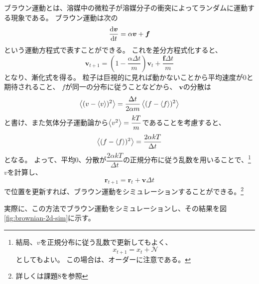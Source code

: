 ブラウン運動とは、溶媒中の微粒子が溶媒分子の衝突によってランダムに運動する現象である。
ブラウン運動は次の
\begin{equation}\label{eq:brownian-motion}
	\odv{\bm{v}}{t} = \alpha \bm{v} + \bm{f}
\end{equation}
という運動方程式で表すことができる。
これを差分方程式化すると、
\begin{equation}
	\bm{v}_{t+1} = \left(1 - \dfrac{\alpha \Delta t}{m}\right) \bm{v}_t + \dfrac{\bm{f} \Delta t}{m}
\end{equation}
となり、漸化式を得る。
粒子は巨視的に見れば動かないことから平均速度が0と期待されること、
$f$が同一の分布に従うことなどから、
$\bm{v}$の分散は
\begin{equation}
	\left< (v - \left< v \right>)^2 \right> = \dfrac{\Delta t}{2 \alpha m} \left< (f - \left< f \right>)^2 \right>
\end{equation}
と書け、また気体分子運動論から$\left< v^2 \right> = \dfrac{kT}{m}$であることを考慮すると、
\begin{equation}
	\left< (f - \left< f \right>)^2 \right> = \dfrac{2 \alpha k T}{\Delta t}
\end{equation}
となる。
よって、平均0、分散が$\dfrac{2 \alpha k T}{\Delta t}$の正規分布に従う乱数を用いることで、\footnote{
	結局、$v$を正規分布に従う乱数で更新してもよく、
	\begin{equation}
		x_{t+1} = x_t + \mathcal{N}
	\end{equation}
	としてもよい。
	この場合は、オーダーに注意である。
}
$v$を計算し、
\begin{equation}
	\bm{r}_{t+1} = \bm{r}_t + \bm{v} \Delta t
\end{equation}
で位置を更新すれば、ブラウン運動をシミュレーションすることができる。\footnote{
	詳しくは\cite{brownian-motion-report}課題8を参照
}

実際に、この方法でブラウン運動をシミュレーションし、その結果を図\ref{fig:brownian-2d-sim}に示す。

